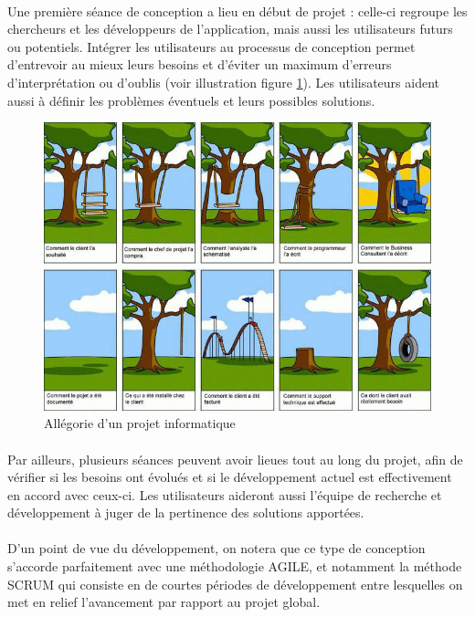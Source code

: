 \paragraph{}
Une première séance de conception a lieu en début de projet : celle-ci regroupe les chercheurs et les développeurs de l'application, mais aussi les utilisateurs futurs ou potentiels. Intégrer les utilisateurs au processus de conception permet d'entrevoir au mieux leurs besoins et d'éviter un maximum d'erreurs d'interprétation ou d'oublis (voir illustration figure \ref{projet_info}). Les utilisateurs aident aussi à définir les problèmes éventuels et leurs possibles solutions.
\begin{figure}
	\centering
	\includegraphics[width=16cm]{images/projet_info.jpg}
	\caption{Allégorie d'un projet informatique}
	\label{projet_info}
\end{figure}

\paragraph{}Par ailleurs, plusieurs séances peuvent avoir lieues tout au long du projet, afin de vérifier si les besoins ont évolués et si le développement actuel est effectivement en accord avec ceux-ci. Les utilisateurs aideront aussi l'équipe de recherche et développement à juger de la pertinence des solutions apportées.
\paragraph{}
D'un point de vue du développement, on notera que ce type de conception s'accorde parfaitement avec une méthodologie AGILE, et notamment la méthode SCRUM qui consiste en de courtes périodes de développement entre lesquelles on met en relief l'avancement par rapport au projet global.
